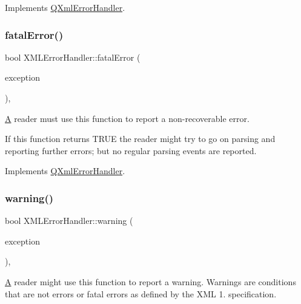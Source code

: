 Implements \mbox{\hyperlink{class_q_xml_error_handler_a7b265803d41782e6207b497fe09beff0}{Q\+Xml\+Error\+Handler}}.

\mbox{\label{class_x_m_l_error_handler_a7e3ad0aecf457ca44b284c71c1ab28bc}} 
\subsubsection{\texorpdfstring{fatalError()}{fatalError()}}
{\footnotesize\ttfamily bool X\+M\+L\+Error\+Handler\+::fatal\+Error (\begin{DoxyParamCaption}\item[{const \mbox{\hyperlink{class_q_xml_parse_exception}{Q\+Xml\+Parse\+Exception}} \&}]{exception }\end{DoxyParamCaption})\hspace{0.3cm}{\ttfamily [inline]}, {\ttfamily [virtual]}}

\mbox{\hyperlink{class_a}{A}} reader must use this function to report a non-\/recoverable error.

If this function returns T\+R\+UE the reader might try to go on parsing and reporting further errors; but no regular parsing events are reported. 

Implements \mbox{\hyperlink{class_q_xml_error_handler_aaa8c1ad1b42a5257cf2344c7fe101797}{Q\+Xml\+Error\+Handler}}.

\mbox{\label{class_x_m_l_error_handler_ae24e6692734e1075c74d0417c1678548}} 
\subsubsection{\texorpdfstring{warning()}{warning()}}
{\footnotesize\ttfamily bool X\+M\+L\+Error\+Handler\+::warning (\begin{DoxyParamCaption}\item[{const \mbox{\hyperlink{class_q_xml_parse_exception}{Q\+Xml\+Parse\+Exception}} \&}]{exception }\end{DoxyParamCaption})\hspace{0.3cm}{\ttfamily [inline]}, {\ttfamily [virtual]}}

\mbox{\hyperlink{class_a}{A}} reader might use this function to report a warning. Warnings are conditions that are not errors or fatal errors as defined by the X\+ML 1. specification.

